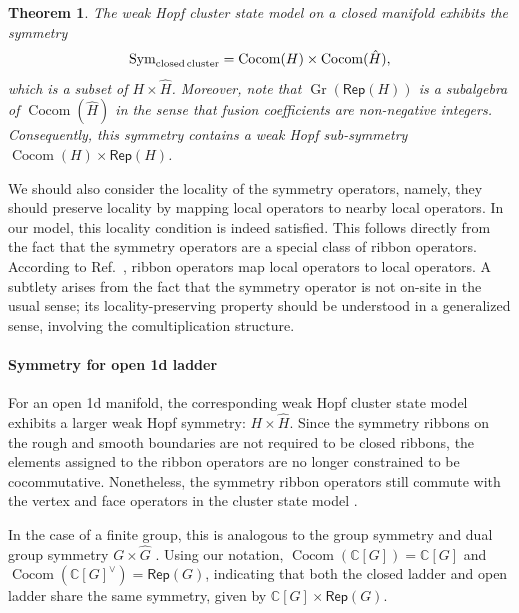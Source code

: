 \documentclass[a4paper,11pt]{article}
\theoremstyle{theorem}
\newtheorem{theorem}{Theorem}
\theoremstyle{remark}
\newcommand{\Rep}{\mathsf{Rep}}
\newcommand{\Cocom}{\operatorname{Cocom}}
\begin{document}
\begin{theorem}
    The weak Hopf cluster state model on a closed manifold exhibits the symmetry
    \begin{equation}
        \operatorname{Sym}_{\rm closed\, cluster} = \Cocom(H) \times \Cocom(\hat{H}),
    \end{equation}
    which is a subset of \( H \times \hat{H} \). 
    Moreover, note that \( \operatorname{Gr}(\Rep(H)) \) is a subalgebra of \( \Cocom(\hat{H}) \) in the sense that fusion coefficients are non-negative integers.  Consequently, this symmetry contains a weak Hopf sub-symmetry \( \Cocom(H) \times \Rep(H) \).
\end{theorem}

We should also consider the locality of the symmetry operators, namely, they should preserve locality by mapping local operators to nearby local operators. 
In our model, this locality condition is indeed satisfied. 
This follows directly from the fact that the symmetry operators are a special class of ribbon operators. 
According to Ref.~\cite[Lemma~5]{Jia2023weak}, ribbon operators map local operators to local operators. 
A subtlety arises from the fact that the symmetry operator is not on-site in the usual sense; its locality-preserving property should be understood in a generalized sense, involving the comultiplication structure.



\paragraph{Symmetry for open 1d ladder}
For an open 1d manifold, the corresponding weak Hopf cluster state model exhibits a larger weak Hopf symmetry: $H \times \hat{H}$. Since the symmetry ribbons on the rough and smooth boundaries are not required to be closed ribbons, the elements assigned to the ribbon operators are no longer constrained to be cocommutative. Nonetheless, the symmetry ribbon operators still commute with the vertex and face operators in the cluster state model \cite{Jia2023weak,chang2014kitaev}. 

In the case of a finite group, this is analogous to the group symmetry and dual group symmetry $G \times \hat{G}$ \cite{Ji2020categoricalsym, Kong2020algebraic}. Using our notation, $\Cocom(\mathbb{C}[G]) = \mathbb{C}[G]$ and $\Cocom(\mathbb{C}[G]^{\vee}) = \Rep(G)$, indicating that both the closed ladder and open ladder share the same symmetry, given by $\mathbb{C}[G] \times \Rep(G)$.
\end{document}
